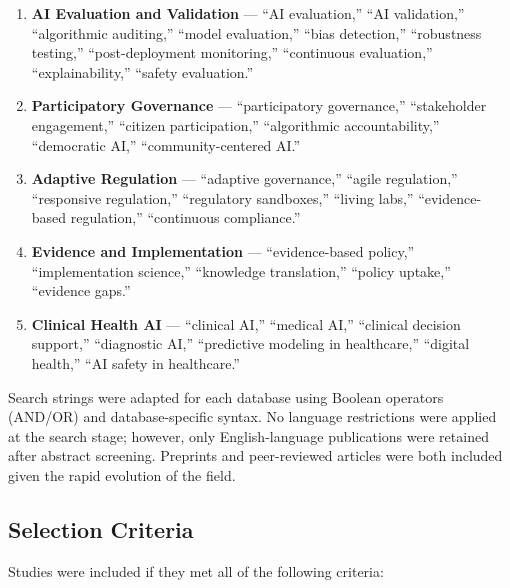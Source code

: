 \begin{enumerate}[label=(\Roman*), itemsep=0.2em]
\item \textbf{AI Evaluation and Validation} — ``AI evaluation,'' ``AI
  validation,'' ``algorithmic auditing,'' ``model evaluation,'' ``bias
  detection,'' ``robustness testing,'' ``post-deployment monitoring,''
  ``continuous evaluation,'' ``explainability,'' ``safety evaluation.''

\item \textbf{Participatory Governance} — ``participatory governance,''
  ``stakeholder engagement,'' ``citizen participation,'' ``algorithmic
  accountability,'' ``democratic AI,'' ``community-centered AI.''

\item \textbf{Adaptive Regulation} — ``adaptive governance,'' ``agile
  regulation,'' ``responsive regulation,'' ``regulatory sandboxes,''
  ``living labs,'' ``evidence-based regulation,'' ``continuous compliance.''

\item \textbf{Evidence and Implementation} — ``evidence-based policy,''
  ``implementation science,'' ``knowledge translation,'' ``policy uptake,''
  ``evidence gaps.''

\item \textbf{Clinical Health AI} — ``clinical AI,'' ``medical AI,''
  ``clinical decision support,'' ``diagnostic AI,'' ``predictive modeling in
  healthcare,'' ``digital health,'' ``AI safety in healthcare.''

\end{enumerate}

Search strings were adapted for each database using Boolean operators
(AND/OR) and database-specific syntax. No language restrictions were applied
at the search stage; however, only English-language publications were
retained after abstract screening. Preprints and peer-reviewed articles
were both included given the rapid evolution of the field.

\subsection{Selection Criteria}
\label{sec:selection_criteria}

Studies were included if they met all of the following criteria:

